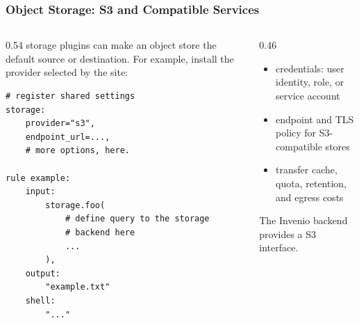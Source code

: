 \begin{frame}[fragile]
	\frametitle{Object Storage: S3 and Compatible Services}
	\begin{columns}[t]
		\begin{column}{0.54\textwidth}
			\Snakemake storage plugins can make an object store the default source or destination. For example, install the provider selected by the site:
			\begin{lstlisting}[language=Snakemake, style=Snakemake, basicstyle=\scriptsize]
# register shared settings
storage:
    provider="s3",
    endpoint_url=...,
    # more options, here.

rule example:
    input:
        storage.foo(
            # define query to the storage
            # backend here
            ...
        ),
    output:
        "example.txt"
    shell:
        "..."
			\end{lstlisting}
		\end{column}
		\begin{column}{0.46\textwidth}
			\begin{hint}
				\begin{itemize}
					\item credentials: user identity, role, or service account
					\item endpoint and TLS policy for S3-compatible stores
					\item transfer cache, quota, retention, and egress costs
				\end{itemize}
			\end{hint}
            \pause
            \begin{hint}[Invenio]
                The Invenio backend provides a S3 interface.
            \end{hint}
		\end{column}
	\end{columns}
\end{frame}

